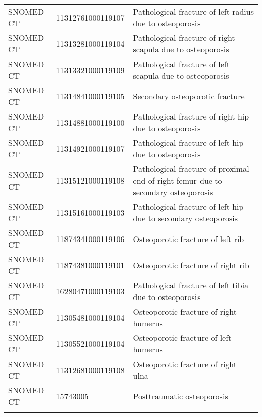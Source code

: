 \begin{longtable}{p{}p{}p{}}
  SNOMED CT & 11312761000119107 & Pathological fracture of left radius due to osteoporosis \\ 
  SNOMED CT & 11313281000119104 & Pathological fracture of right scapula due to osteoporosis \\ 
  SNOMED CT & 11313321000119109 & Pathological fracture of left scapula due to osteoporosis \\ 
  SNOMED CT & 11314841000119105 & Secondary osteoporotic fracture \\ 
  SNOMED CT & 11314881000119100 & Pathological fracture of right hip due to osteoporosis \\ 
  SNOMED CT & 11314921000119107 & Pathological fracture of left hip due to osteoporosis \\ 
  SNOMED CT & 11315121000119108 & Pathological fracture of proximal end of right femur due to secondary osteoporosis \\ 
  SNOMED CT & 11315161000119103 & Pathological fracture of left hip due to secondary osteoporosis \\ 
  SNOMED CT & 11874341000119106 & Osteoporotic fracture of left rib \\ 
  SNOMED CT & 11874381000119101 & Osteoporotic fracture of right rib \\ 
  SNOMED CT & 16280471000119103 & Pathological fracture of left tibia due to osteoporosis \\ 
  SNOMED CT & 11305481000119104 & Osteoporotic fracture of right humerus \\ 
  SNOMED CT & 11305521000119104 & Osteoporotic fracture of left humerus \\ 
  SNOMED CT & 11312681000119108 & Osteoporotic fracture of right ulna \\ 
  SNOMED CT & 15743005 & Posttraumatic osteoporosis \\ 
  \hline
\label{tab:codes_osteoporosis}
\end{longtable}
